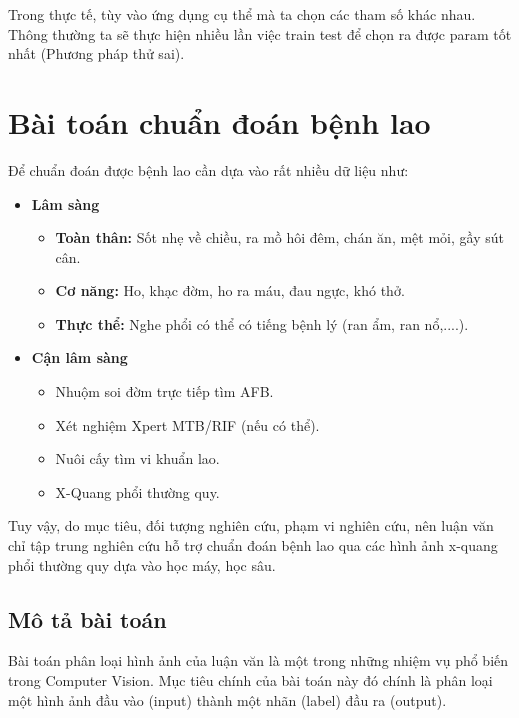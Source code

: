 Trong thực tế, tùy vào ứng dụng cụ thể mà ta chọn các tham số khác nhau. Thông thường ta sẽ thực hiện nhiều lần việc train test để chọn ra được param tốt nhất (Phương pháp thử sai).

\section{Bài toán chuẩn đoán bệnh lao}
Để chuẩn đoán được bệnh lao cần dựa vào rất nhiều dữ liệu \cite{bytchuandoanlao} như: 
\begin{itemize}
	\item {\bfseries Lâm sàng}
	\begin{itemize}
		\item {\bfseries Toàn thân:} Sốt nhẹ về chiều, ra mồ hôi đêm, chán ăn, mệt mỏi, gầy sút cân.
		\item {\bfseries Cơ năng:} Ho, khạc đờm, ho ra máu, đau ngực, khó thở.
		\item {\bfseries Thực thể:} Nghe phổi có thể có tiếng bệnh lý (ran ẩm, ran nổ,....).
	\end{itemize}
	\item {\bfseries Cận lâm sàng}
	\begin{itemize}
		\item Nhuộm soi đờm trực tiếp tìm AFB.
		\item Xét nghiệm Xpert MTB/RIF (nếu có thể).
		\item Nuôi cấy tìm vi khuẩn lao.
		\item X-Quang phổi thường quy.
	\end{itemize}
\end{itemize}

Tuy vậy, do mục tiêu, đối tượng nghiên cứu, phạm vi nghiên cứu, nên luận văn chỉ tập trung nghiên cứu hỗ trợ chuẩn đoán bệnh lao qua các hình ảnh x-quang phổi thường quy dựa vào học máy, học sâu.

\subsection{Mô tả bài toán}
Bài toán phân loại hình ảnh của luận văn là một trong những nhiệm vụ phổ biến trong Computer Vision. Mục tiêu chính của bài toán này đó chính là phân loại một hình ảnh đầu vào (input) thành một nhãn (label) đầu ra (output).  

